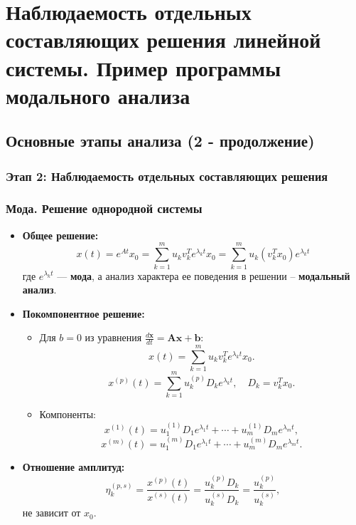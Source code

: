 	\section{Наблюдаемость отдельных составляющих решения линейной системы. Пример программы модального анализа}
	
	\subsection{Основные этапы анализа (2 - продолжение)}
	
	\subsubsection{Этап 2: Наблюдаемость отдельных составляющих решения}
	
	\subsubsection*{Мода. Решение однородной системы}
	
	\begin{itemize}
		\item \textbf{Общее решение:}
		\begin{equation}
			x(t) = e^{A t} x_0 = \sum_{k=1}^{m} u_k v_k^{T} e^{\lambda_k t} x_0 
			= \sum_{k=1}^{m} u_k \left( v_k^{T} x_0 \right) e^{\lambda_k t}
		\end{equation}
		где \(e^{\lambda_k t}\) — \textbf{мода}, а анализ характера ее поведения в решении – \textbf{модальный анализ}.
		\item \textbf{Покомпонентное решение:}
		\begin{itemize}
			\item Для \(b = 0\) из уравнения $\frac{d \mathbf{x}}{d t} = \mathbf{A} \mathbf{x} + \mathbf{b}$:
			\begin{equation}
				x(t) = \sum_{k=1}^m u_k v_k^T e^{\lambda_k t} x_0.
			\end{equation}
			\begin{equation}
				x^{(p)}(t) = \sum_{k=1}^m u_k^{(p)} D_k e^{\lambda_k t}, \quad D_k = v_k^T x_0.
			\end{equation}
			\item Компоненты:
			\begin{equation}
				x^{(1)}(t) = u_1^{(1)} D_1 e^{\lambda_1 t} + \cdots + u_m^{(1)} D_m e^{\lambda_m t},
			\end{equation}
			\begin{equation}
				x^{(m)}(t) = u_1^{(m)} D_1 e^{\lambda_1 t} + \cdots + u_m^{(m)} D_m e^{\lambda_m t}.
			\end{equation}
		\end{itemize}
		\item \textbf{Отношение амплитуд:}
		\begin{equation}
			\eta_k^{(p,s)} = \frac{x^{(p)}(t)}{x^{(s)}(t)} = \frac{u_k^{(p)} D_k}{u_k^{(s)} D_k} = \frac{u_k^{(p)}}{u_k^{(s)}},
		\end{equation}
		не зависит от \(x_0\).
	\end{itemize}
	
